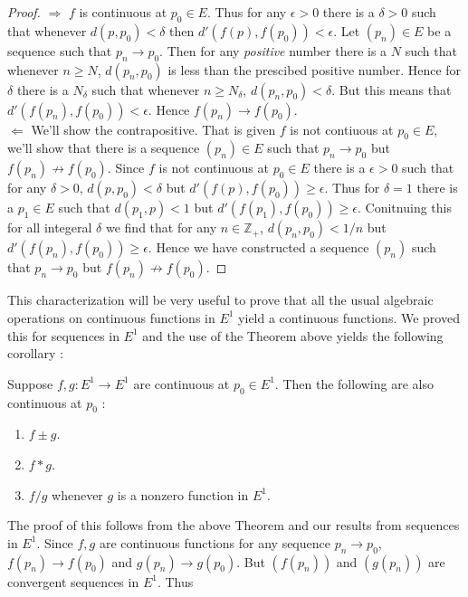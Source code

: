 \begin{proof}
    $\Rightarrow$ $f$ is continuous at $p_0 \in E$. Thus for any $\epsilon > 0$ there is a $\delta >
    0$ such that whenever $d(p,p_0) < \delta$ then $d'(f(p),f(p_0)) < \epsilon$. Let $\left(p_n\right)
    \in E$ be a sequence such that $p_n \to p_0$. Then for any \emph{positive} number there is a $N$ such
    that whenever $n \geq N$, $d(p_n ,p_0)$ is less than the prescibed positive number. Hence for
    $\delta$ there is a $N_{\delta}$ such that whenever $n \geq N_{\delta}$, $d(p_n,p_0) < \delta$. But
    this means that $d'(f(p_n),f(p_0)) < \epsilon$. Hence $f(p_n) \to f(p_0)$.
    \\
    $\Leftarrow$ We'll show the contrapositive. That is given $f$ is not contiuous at $p_0 \in E$, 
    we'll show that there is a sequence $\left(p_n\right) \in E$ such that $p_n \to p_0$ but $f(p_n)
    \not \to f(p_0)$. Since $f$ is not continuous at $p_0 \in E$ there is a $\epsilon > 0$ such that
    for any $\delta > 0$, $d(p,p_0) < \delta$ but $d'(f(p),f(p_0)) \geq \epsilon$. Thus for
    $\delta = 1$ there is a $p_1 \in E$  such that $d(p_1,p) < 1$ but $d'(f(p_1),f(p_0)) \geq 
    \epsilon$. Conitnuing this for all integeral $\delta$ we find that for any $n \in \mathbb{Z}_+$, 
    $d(p_n,p_0) < 1/n$ but $d'(f(p_n),f(p_0)) \geq \epsilon$. Hence we have constructed a sequence
    $\left(p_n\right)$ such that $p_n \to p_0$ but $f(p_n) \not \to f(p_0)$.
\end{proof}
This characterization will be very useful to prove that all the usual algebraic operations on 
continuous functions in $E^1$ yield a continuous functions. We proved this for sequences in $E^1$
and the use of the Theorem above yields the following corollary :
\begin{Corollary}
    Suppose $f,g : E^1 \to E^1$ are continuous at $p_0 \in E^1$. Then the following are also
    continuous at $p_0$ : 
    \begin{enumerate}
	\item $f \pm g$. 
	\item $f * g$.
	\item $f / g $ whenever $g$ is a nonzero function in $E^1$.
    \end{enumerate}
\end{Corollary}
The proof of this follows from the above Theorem and our results from sequences in $E^1$. Since
$f,g$ are continuous functions for any sequence $p_n \to p_0$, $f(p_n) \to f(p_0)$ and $g(p_n) \to
g(p_0)$. But $\left(f(p_n)\right)$ and $\left(g(p_n)\right)$ are convergent sequences in $E^1$. Thus
